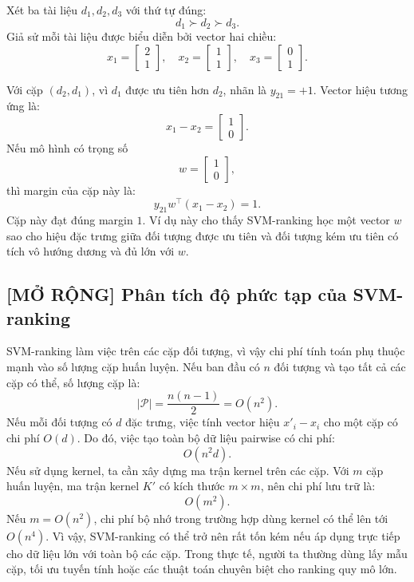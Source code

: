Xét ba tài liệu \(d_1,d_2,d_3\) với thứ tự đúng:
\[
    d_1 \succ d_2 \succ d_3.
\]
Giả sử mỗi tài liệu được biểu diễn bởi vector hai chiều:
\[
    x_1=
    \begin{bmatrix}
        2\\
        1
    \end{bmatrix},
    \quad
    x_2=
    \begin{bmatrix}
        1\\
        1
    \end{bmatrix},
    \quad
    x_3=
    \begin{bmatrix}
        0\\
        1
    \end{bmatrix}.
\]

Với cặp \((d_2,d_1)\), vì \(d_1\) được ưu tiên hơn \(d_2\), nhãn là \(y_{21}=+1\). Vector hiệu tương ứng là:
\[
    x_1-x_2
    =
    \begin{bmatrix}
        1\\
        0
    \end{bmatrix}.
\]
Nếu mô hình có trọng số
\[
    w=
    \begin{bmatrix}
        1\\
        0
    \end{bmatrix},
\]
thì margin của cặp này là:
\[
    y_{21}w^\top(x_1-x_2)=1.
\]
Cặp này đạt đúng margin \(1\). Ví dụ này cho thấy SVM-ranking học một vector \(w\) sao cho hiệu đặc trưng giữa đối tượng được ưu tiên và đối tượng kém ưu tiên có tích vô hướng dương và đủ lớn với \(w\).

\subsection{[MỞ RỘNG] Phân tích độ phức tạp của SVM-ranking}

SVM-ranking làm việc trên các cặp đối tượng, vì vậy chi phí tính toán phụ thuộc mạnh vào số lượng cặp huấn luyện. Nếu ban đầu có \(n\) đối tượng và tạo tất cả các cặp có thể, số lượng cặp là:
\begin{equation}
    |\mathcal{P}|
    =
    \frac{n(n-1)}{2}
    =
    O(n^2).
    \label{eq:section4-pair-count}
\end{equation}
Nếu mỗi đối tượng có \(d\) đặc trưng, việc tính vector hiệu \(x'_i-x_i\) cho một cặp có chi phí \(O(d)\). Do đó, việc tạo toàn bộ dữ liệu pairwise có chi phí:
\[
    O(n^2d).
\]
Nếu sử dụng kernel, ta cần xây dựng ma trận kernel trên các cặp. Với \(m\) cặp huấn luyện, ma trận kernel \(K'\) có kích thước \(m\times m\), nên chi phí lưu trữ là:
\[
    O(m^2).
\]
Nếu \(m=O(n^2)\), chi phí bộ nhớ trong trường hợp dùng kernel có thể lên tới \(O(n^4)\). Vì vậy, SVM-ranking có thể trở nên rất tốn kém nếu áp dụng trực tiếp cho dữ liệu lớn với toàn bộ các cặp. Trong thực tế, người ta thường dùng lấy mẫu cặp, tối ưu tuyến tính hoặc các thuật toán chuyên biệt cho ranking quy mô lớn.

